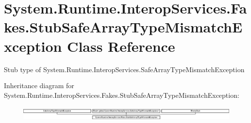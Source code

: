 \hypertarget{class_system_1_1_runtime_1_1_interop_services_1_1_fakes_1_1_stub_safe_array_type_mismatch_exception}{\section{System.\-Runtime.\-Interop\-Services.\-Fakes.\-Stub\-Safe\-Array\-Type\-Mismatch\-Exception Class Reference}
\label{class_system_1_1_runtime_1_1_interop_services_1_1_fakes_1_1_stub_safe_array_type_mismatch_exception}
}


Stub type of System.\-Runtime.\-Interop\-Services.\-Safe\-Array\-Type\-Mismatch\-Exception 


Inheritance diagram for System.\-Runtime.\-Interop\-Services.\-Fakes.\-Stub\-Safe\-Array\-Type\-Mismatch\-Exception\-:\begin{figure}[H]
\begin{center}
\leavevmode
\includegraphics[height=0.761905cm]{class_system_1_1_runtime_1_1_interop_services_1_1_fakes_1_1_stub_safe_array_type_mismatch_exception}
\end{center}
\end{figure}
